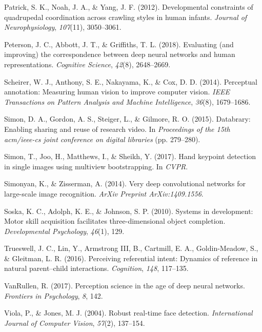 \documentclass[english,man]{apa6}
\begin{document}
\hypertarget{ref-patrick2012developmental}{}
Patrick, S. K., Noah, J. A., \& Yang, J. F. (2012). Developmental
constraints of quadrupedal coordination across crawling styles in human
infants. \emph{Journal of Neurophysiology}, \emph{107}(11), 3050--3061.

\hypertarget{ref-peterson2018evaluating}{}
Peterson, J. C., Abbott, J. T., \& Griffiths, T. L. (2018). Evaluating
(and improving) the correspondence between deep neural networks and
human representations. \emph{Cognitive Science}, \emph{42}(8),
2648--2669.

\hypertarget{ref-scheirer2014perceptual}{}
Scheirer, W. J., Anthony, S. E., Nakayama, K., \& Cox, D. D. (2014).
Perceptual annotation: Measuring human vision to improve computer
vision. \emph{IEEE Transactions on Pattern Analysis and Machine
Intelligence}, \emph{36}(8), 1679--1686.

\hypertarget{ref-simon2015databrary}{}
Simon, D. A., Gordon, A. S., Steiger, L., \& Gilmore, R. O. (2015).
Databrary: Enabling sharing and reuse of research video. In
\emph{Proceedings of the 15th acm/ieee-cs joint conference on digital
libraries} (pp. 279--280).

\hypertarget{ref-simon2017hand}{}
Simon, T., Joo, H., Matthews, I., \& Sheikh, Y. (2017). Hand keypoint
detection in single images using multiview bootstrapping. In
\emph{CVPR}.

\hypertarget{ref-simonyan2014very}{}
Simonyan, K., \& Zisserman, A. (2014). Very deep convolutional networks
for large-scale image recognition. \emph{ArXiv Preprint
ArXiv:1409.1556}.

\hypertarget{ref-soska2010systems}{}
Soska, K. C., Adolph, K. E., \& Johnson, S. P. (2010). Systems in
development: Motor skill acquisition facilitates three-dimensional
object completion. \emph{Developmental Psychology}, \emph{46}(1), 129.

\hypertarget{ref-trueswell2016perceiving}{}
Trueswell, J. C., Lin, Y., Armstrong III, B., Cartmill, E. A.,
Goldin-Meadow, S., \& Gleitman, L. R. (2016). Perceiving referential
intent: Dynamics of reference in natural parent--child interactions.
\emph{Cognition}, \emph{148}, 117--135.

\hypertarget{ref-vanrullen2017perception}{}
VanRullen, R. (2017). Perception science in the age of deep neural
networks. \emph{Frontiers in Psychology}, \emph{8}, 142.

\hypertarget{ref-viola2004robust}{}
Viola, P., \& Jones, M. J. (2004). Robust real-time face detection.
\emph{International Journal of Computer Vision}, \emph{57}(2), 137--154.
\end{document}
